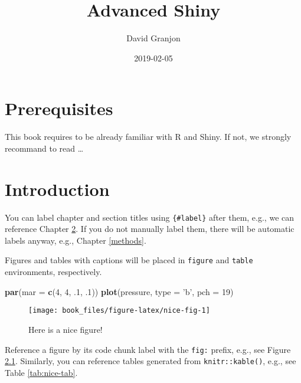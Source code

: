 \documentclass[]{book}
\title{Advanced Shiny}
\author{David Granjon}
\date{2019-02-05}
\newenvironment{Shaded}{\begin{snugshade}}{\end{snugshade}}
\newcommand{\DataTypeTok}[1]{\textcolor[rgb]{0.13,0.29,0.53}{#1}}
\newcommand{\DecValTok}[1]{\textcolor[rgb]{0.00,0.00,0.81}{#1}}
\newcommand{\FloatTok}[1]{\textcolor[rgb]{0.00,0.00,0.81}{#1}}
\newcommand{\KeywordTok}[1]{\textcolor[rgb]{0.13,0.29,0.53}{\textbf{#1}}}
\newcommand{\NormalTok}[1]{#1}
\newcommand{\StringTok}[1]{\textcolor[rgb]{0.31,0.60,0.02}{#1}}
\begin{document}
\maketitle

{
\setcounter{tocdepth}{1}
\tableofcontents
}
\hypertarget{prerequisites}{%
\chapter{Prerequisites}\label{prerequisites}}

This book requires to be already familiar with R and Shiny. If not, we strongly recommand to read \ldots{}

\hypertarget{intro}{%
\chapter{Introduction}\label{intro}}

You can label chapter and section titles using \texttt{\{\#label\}} after them, e.g., we can reference Chapter \ref{intro}. If you do not manually label them, there will be automatic labels anyway, e.g., Chapter \ref{methods}.

Figures and tables with captions will be placed in \texttt{figure} and \texttt{table} environments, respectively.

\begin{Shaded}
\begin{Highlighting}[]
\KeywordTok{par}\NormalTok{(}\DataTypeTok{mar =} \KeywordTok{c}\NormalTok{(}\DecValTok{4}\NormalTok{, }\DecValTok{4}\NormalTok{, }\FloatTok{.1}\NormalTok{, }\FloatTok{.1}\NormalTok{))}
\KeywordTok{plot}\NormalTok{(pressure, }\DataTypeTok{type =} \StringTok{'b'}\NormalTok{, }\DataTypeTok{pch =} \DecValTok{19}\NormalTok{)}
\end{Highlighting}
\end{Shaded}

\begin{figure}

{\centering \texttt{[image: book\_files/figure-latex/nice-fig-1]} 

}

\caption{Here is a nice figure!}\label{fig:nice-fig}
\end{figure}

Reference a figure by its code chunk label with the \texttt{fig:} prefix, e.g., see Figure \ref{fig:nice-fig}. Similarly, you can reference tables generated from \texttt{knitr::kable()}, e.g., see Table \ref{tab:nice-tab}.
\end{document}
